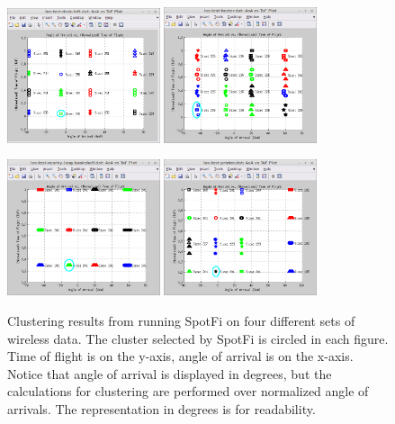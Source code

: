 \documentclass[12pt]{report}
\begin{document}
\begin{figure}[!htb]
    \begin{center}
        \caption{Clustering results from running SpotFi on four different sets of wireless data. The cluster selected by SpotFi is circled in each figure. Time of flight is on the y-axis, angle of arrival is on the x-axis. Notice that angle of arrival is displayed in degrees, but the calculations for clustering are performed over normalized angle of arrivals. The representation in degrees is for readability.}
        \label{figure: spotfi-clustering}
        \includegraphics[width=0.4\textwidth]{../images/clustering-desk-left.png}
        \includegraphics[width=0.4\textwidth]{../images/clustering-heater.png}
        \par\smallskip
        \includegraphics[width=0.4\textwidth]{../images/clustering-long-bookshelf.png}
        \includegraphics[width=0.4\textwidth]{../images/clustering-printer.png}
    \end{center}
\end{figure}
\end{document}
